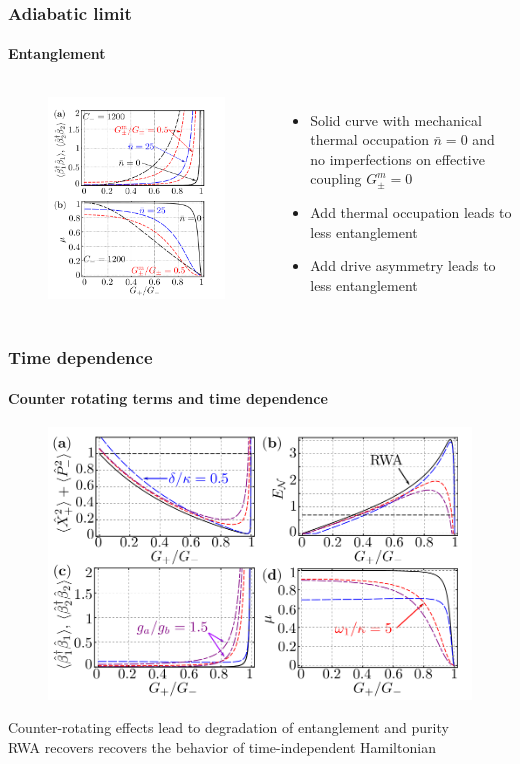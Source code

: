 \documentclass[aspectratio=43]{beamer}
\begin{document}
\begin{frame}
	
	\frametitle{Adiabatic limit}
	\framesubtitle{Entanglement}
	
	\begin{columns}
		
		
		\begin{figure}
			\includegraphics[width = 6 cm]{plots/plot_steady_state.png}
		\end{figure}	
		
		
		\begin{itemize}
			\item Solid curve with mechanical thermal occupation $\bar{n} = 0$ and no imperfections on effective coupling $G^{m}_{\pm} = 0$
			\item Add thermal occupation leads to less entanglement
			\item Add drive asymmetry leads to less entanglement
		\end{itemize}
		
	\end{columns}

\end{frame}

\begin{frame}

\frametitle{Time dependence}
\framesubtitle{Counter rotating terms and time dependence}

	\begin{figure}
		\includegraphics[width = 9 cm]{plots/plot_time_dependence.png}
	\end{figure}	
	
	Counter-rotating effects lead to degradation of entanglement and purity\\
	RWA recovers recovers the behavior of time-independent Hamiltonian
\end{frame}
\end{document}
